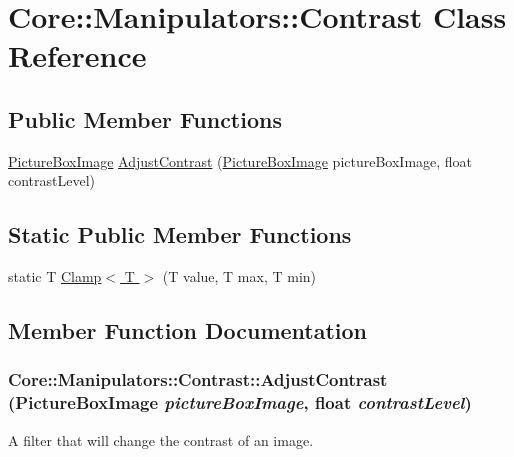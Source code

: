 \hypertarget{class_core_1_1_manipulators_1_1_contrast}{
\section{Core::Manipulators::Contrast Class Reference}
\label{class_core_1_1_manipulators_1_1_contrast}
}
\subsection*{Public Member Functions}
\begin{DoxyCompactItemize}
\item 
\hyperlink{class_core_1_1_images_1_1_picture_box_image}{PictureBoxImage} \hyperlink{class_core_1_1_manipulators_1_1_contrast_a8362f6c82ab06aa2ff52d7cb3360b28b}{AdjustContrast} (\hyperlink{class_core_1_1_images_1_1_picture_box_image}{PictureBoxImage} pictureBoxImage, float contrastLevel)
\end{DoxyCompactItemize}
\subsection*{Static Public Member Functions}
\begin{DoxyCompactItemize}
\item 
static T \hyperlink{class_core_1_1_manipulators_1_1_contrast_a4898ce913d2031a4c9fa6fe73eba5c0e}{Clamp$<$ T $>$} (T value, T max, T min)
\end{DoxyCompactItemize}


\subsection{Member Function Documentation}
\hypertarget{class_core_1_1_manipulators_1_1_contrast_a8362f6c82ab06aa2ff52d7cb3360b28b}{
\subsubsection[{AdjustContrast}]{ Core::Manipulators::Contrast::AdjustContrast ({\bf PictureBoxImage} {\em pictureBoxImage}, \/  float {\em contrastLevel})}}
\label{class_core_1_1_manipulators_1_1_contrast_a8362f6c82ab06aa2ff52d7cb3360b28b}
A filter that will change the contrast of an image.


